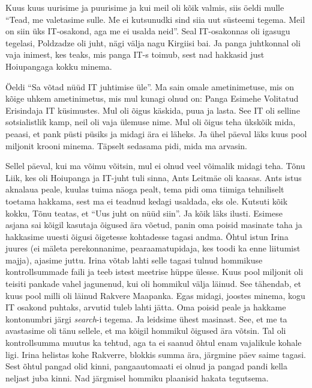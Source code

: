 Kuus kuus uurisime ja puurisime ja kui meil oli kõik valmis, siis öeldi mulle \enquote{Tead, me valetasime sulle. Me ei kutsunudki sind siia uut süsteemi tegema. Meil on siin üks IT-osakond, aga me ei usalda neid}. Seal IT-osakonnas oli igasugu tegelasi, Poldzadze oli juht, nägi välja nagu Kirgiisi bai. Ja panga juhtkonnal oli vaja inimest, kes teaks, mis panga IT-s toimub, sest nad hakkasid just Hoiupangaga kokku minema. 

Öeldi \enquote{Sa võtad nüüd IT juhtimise üle}. Ma sain omale ametinimetuse, mis on kõige uhkem ametinimetus, mis mul kunagi olnud on: Panga Esimehe Volitatud Erisindaja IT küsimustes. Mul oli õigus käskida, puua ja lasta. See IT oli selline sotsialistlik kamp, neil oli vaja ülemuse nime. Mul oli õigus teha ükskõik mida, peaasi, et pank püsti püsiks ja midagi ära ei läheks. Ja ühel päeval läks kuus pool miljonit krooni minema. Täpselt sedasama pidi, mida ma arvasin. 

Sellel päeval, kui ma võimu võitsin, mul ei olnud veel võimalik midagi teha. Tõnu Liik, kes oli Hoiupanga ja IT-juht tuli sinna, Ants Leitmäe oli kaasas. Ants istus aknalaua peale, kuulas tuima näoga pealt, tema pidi oma tiimiga tehniliselt toetama hakkama, sest ma ei teadnud kedagi usaldada, eks ole. Kutsuti kõik kokku, Tõnu teatas, et \enquote{Uus juht on nüüd siin}. Ja kõik läks ilusti. Esimese asjana sai kõigil kasutaja õigused ära võetud, panin oma poisid masinate taha ja hakkasime uuesti õigusi õigetesse kohtadesse tagasi andma. Õhtul istun Irina juures (ei mäleta perekonnanime, pearaamatupidaja, kes toodi ka enne liitumist majja), ajasime juttu.  Irina võtab lahti selle tagasi tulnud hommikuse kontrollsummade faili ja teeb istest meetrise hüppe ülesse. Kuus pool miljonit oli teisiti pankade vahel jagunenud, kui oli hommikul välja läinud. See tähendab, et kuus pool milli oli läinud Rakvere Maapanka. Egas midagi, joostes minema, kogu IT osakond puhtaks, arvutid tuleb lahti jätta. Oma poisid peale ja hakkame kontonumbri järgi \emph{search}-i tegema. Ja leidsime ühest masinast. See, et me ta avastasime oli tänu sellele, et ma kõigil hommikul õigused ära võtsin. Tal oli kontrollsumma muutus ka tehtud, aga ta ei saanud õhtul enam vajalikule kohale ligi. Irina helistas kohe Rakverre, blokkis summa ära, järgmine päev saime tagasi. Sest õhtul pangad olid kinni, pangaautomaati ei olnud ja pangad pandi kella neljast juba kinni. Nad järgmisel hommiku plaanisid hakata tegutsema.  

